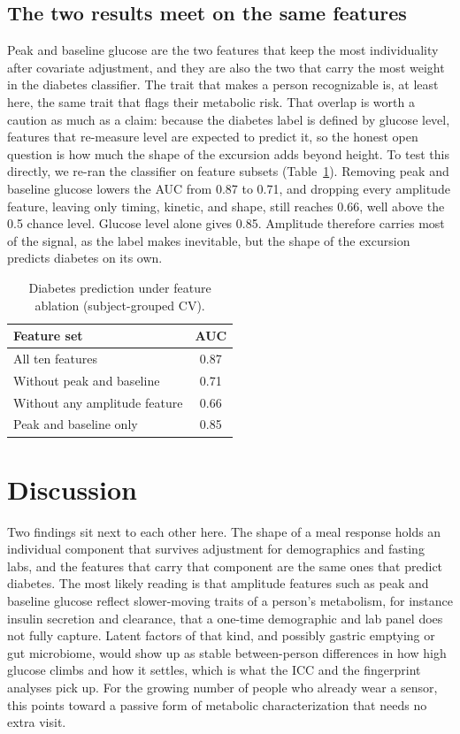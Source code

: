\documentclass[10pt,conference,compsoc]{IEEEtran}
\begin{document}
\subsection{The two results meet on the same features}
Peak and baseline glucose are the two features that keep the most individuality
after covariate adjustment, and they are also the two that carry the most weight
in the diabetes classifier. The trait that makes a person recognizable is, at
least here, the same trait that flags their metabolic risk. That overlap is worth
a caution as much as a claim: because the diabetes label is defined by glucose
level, features that re-measure level are expected to predict it, so the honest
open question is how much the shape of the excursion adds beyond height. To test
this directly, we re-ran the classifier on feature subsets
(Table~\ref{tab:ablation}). Removing peak and baseline glucose lowers the AUC from
0.87 to 0.71, and dropping every amplitude feature, leaving only timing, kinetic,
and shape, still reaches 0.66, well above the 0.5 chance level. Glucose level
alone gives 0.85. Amplitude therefore carries most of the signal, as the label
makes inevitable, but the shape of the excursion predicts diabetes on its own.

\begin{table}[!t]
\centering
\caption{Diabetes prediction under feature ablation (subject-grouped CV).}
\label{tab:ablation}
\begin{tabular}{lc}
\hline
Feature set & AUC \\
\hline
All ten features & 0.87 \\
Without peak and baseline & 0.71 \\
Without any amplitude feature & 0.66 \\
Peak and baseline only & 0.85 \\
\hline
\end{tabular}
\end{table}

\section{Discussion}

Two findings sit next to each other here. The shape of a meal response holds an
individual component that survives adjustment for demographics and fasting labs,
and the features that carry that component are the same ones that predict
diabetes. The most likely reading is that amplitude features such as peak and
baseline glucose reflect slower-moving traits of a person's metabolism, for
instance insulin secretion and clearance, that a one-time demographic and lab
panel does not fully capture. Latent factors of that kind, and possibly gastric
emptying or gut microbiome, would show up as stable between-person differences in
how high glucose climbs and how it settles, which is what the ICC and the
fingerprint analyses pick up. For the growing number of people who already wear a
sensor, this points toward a passive form of metabolic characterization that needs
no extra visit.
\end{document}
